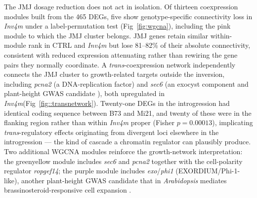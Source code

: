 \documentclass[9pt,twocolumn,twoside]{rilabRxiv}
\newcommand{\invfour}{\textit{Inv4m}\xspace}
\begin{document}
The JMJ dosage reduction does not act in isolation.
Of thirteen coexpression modules built from the 465 DEGs, five show genotype-specific connectivity loss in \invfour under a label-permutation test (Fig~\ref{fig:wgcna}), including the pink module to which the JMJ cluster belongs.
JMJ genes retain similar within-module rank in CTRL and \invfour but lose 81--82\% of their absolute connectivity, consistent with reduced expression attenuating rather than rewiring the gene pairs they normally coordinate.
A \textit{trans}-coexpression network independently connects the JMJ cluster to growth-related targets outside the inversion, including \textit{pcna2} (a DNA-replication factor) and \textit{sec6} (an exocyst component and plant-height GWAS candidate \citep{peiffer2014}), both upregulated in \invfour (Fig~\ref{fig::transnetwork}).
Twenty-one DEGs in the introgression had identical coding sequence between B73 and Mi21, and twenty of these were in the flanking region rather than within \invfour proper (Fisher $p = 0.00013$), implicating \textit{trans}-regulatory effects originating from divergent loci elsewhere in the introgression --- the kind of cascade a chromatin regulator can plausibly produce.
Two additional WGCNA modules reinforce the growth-network interpretation: the greenyellow module includes \textit{sec6} and \textit{pcna2} together with the cell-polarity regulator \textit{ropgef14}; the purple module includes \textit{exo}/\textit{phi1} (EXORDIUM/Phi-1-like), another plant-height GWAS candidate \citep{liu2023, peiffer2014} that in \textit{Arabidopsis} mediates brassinosteroid-responsive cell expansion \citep{farrar2003, collgarcia2004, schroeder2009}.




\end{document}

